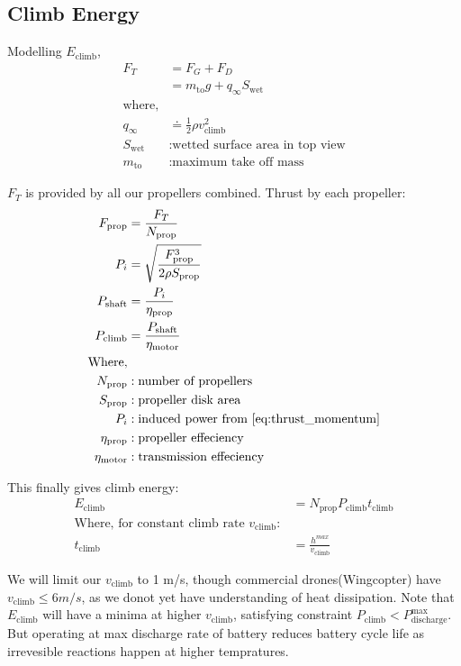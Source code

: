 \subsection{Climb Energy}
\label{sec:climb_energy}

Modelling $E_\text{climb}$,
\begin{align*}
    F_T &=F_G + F_D\\
    &= m_\text{to}g + q_\infty S_\text{wet}\\
    \text{where},\\
    q_\infty &\doteq \frac{1}{2} \rho v_\text{climb}^2 \\
    S_\text{wet} &: \text{wetted surface area in top view} \\
    m_\text{to} &: \text{maximum take off mass}
\end{align*}

$F_T$ is provided by all our propellers combined. Thrust by each propeller:
\begin{align*}
    F_\text{prop} &= \frac{F_T}{N_\text{prop}} \\
    P_i &= \sqrt{\frac{F_\text{prop}^3}{2 \rho S_\text{prop}}} \\
    P_\text{shaft} &= \frac{P_i}{\eta_\text{prop}} \\
    P_\text{climb} &= \frac{P_\text{shaft}}{\eta_\text{motor}}\\
    \text{Where},\\
    N_\text{prop}&: \text{number of propellers} \\
    S_\text{prop} &: \text{propeller disk area} \\
    P_i &: \text{induced power from \eqref{eq:thrust_momentum}} \\
    \eta_\text{prop} &: \text{propeller effeciency} \\
    \eta_\text{motor} &: \text{transmission effeciency}
\end{align*}

This finally gives climb energy:
\begin{align*}
    E_\text{climb} &= N_\text{prop} P_\text{climb} t_\text{climb}\\
    \text{Where, for constant climb rate } v_\text{climb}: \\
    t_\text{climb} &= \frac{h^{max}}{v_\text{climb}}
\end{align*}

We will limit our $v_\text{climb}$ to 1 m/s, though commercial drones(Wingcopter) have $v_\text{climb} \leqslant 6 m/s$, as we donot yet have understanding of heat dissipation. Note that $E_\text{climb}$ will have a minima at higher $v_\text{climb}$, satisfying constraint $P_\text{climb} < P_{\text{discharge}}^\text{max}$. But operating at max discharge rate of battery reduces battery cycle life as irrevesible reactions happen at higher tempratures.


